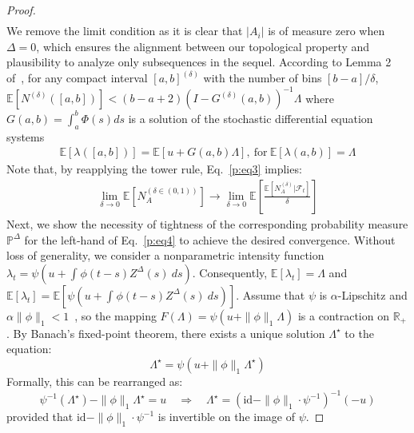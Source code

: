 \documentclass[10pt]{article}
\numberwithin{figure}{section}
\begin{document}
\begin{proof}
\begin{align}
\end{align}
We remove the limit condition as it is clear that $|A_i|$ is of measure zero when $\Delta = 0$, which ensures the alignment between our topological property and plausibility to analyze only subsequences in the sequel.
According to Lemma 2 of~\citep{kirchner_hawkes_2016}, for any compact interval $[a,b]^{(\delta)}$ with the number of bins $[b-a]/\delta$, $\mathbb{E}[N^{(\delta)}([a,b])]<(b-a+2)(I-G^{(\delta)}(a,b))^{-1}\Lambda$ where $G(a,b)=\int_{a}^{b}\Phi(s)ds$ is a solution of the stochastic differential equation systems
\begin{align*}
    \mathbb{E}[\lambda([a,b])]= \mathbb{E}[u+G(a,b)\Lambda],\ \text{for} ~ \mathbb{E}[\lambda(a,b)]=\Lambda
\end{align*}
Note that, by reapplying the tower rule,  Eq.~\eqref{p:eq3} implies:
\begin{align*}
    \lim_{\delta\rightarrow 0}^{} \mathbb{E}[N_{A}^{(\delta \in (0,1))}]\rightarrow \lim_{\delta\rightarrow 0}^{} \mathbb{E}[\frac{\mathbb{E}[N_A^{(\delta)}|\mathcal{F}_t ]}{\delta}]
\end{align*}
Next, we show the necessity of tightness of the corresponding probability measure $\mathbb{P}^{\Delta}$  for the left-hand of  Eq.~\eqref{p:eq4} to achieve the desired convergence. Without loss of generality, we consider a nonparametric intensity function $\lambda_t = \psi(u+\int_{}^{}\phi(t-s)Z^{\Delta}(s)\ ds)$. Consequently, $\mathbb{E}[\lambda_t]=\Lambda$ and $\mathbb{E}[\lambda_t]= \mathbb{E}[\psi(u+\int_{}^{}\phi(t-s)Z^{\Delta}(s)\ ds)]$.  Assume that \( \psi \) is \( \alpha \)-Lipschitz and \( \alpha \|\phi\|_1 < 1 \)~\citep{bremaud_stability_1996}, so the mapping \( F(\Lambda) = \psi(u + \|\phi\|_1 \Lambda) \) is a contraction on \( \mathbb{R}_+ \). By Banach’s fixed-point theorem, there exists a unique solution \( \Lambda^\star \) to the equation:
\[
\Lambda^\star = \psi(u + \|\phi\|_1 \Lambda^\star)
\]
Formally, this can be rearranged as:
\[
\psi^{-1}(\Lambda^\star) - \|\phi\|_1 \Lambda^\star = u
\quad \Longrightarrow \quad \Lambda^\star = \left( \mathrm{id} - \|\phi\|_1 \cdot \psi^{-1} \right)^{-1}(-u)
\]
provided that \( \mathrm{id} - \|\phi\|_1 \cdot \psi^{-1} \) is invertible on the image of \(\psi\).


\end{proof}
\end{document}
